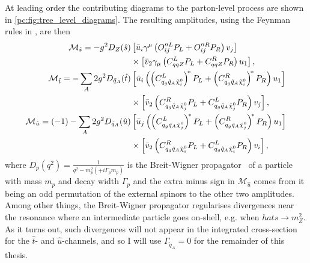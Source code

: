 \documentclass[../main.tex]{subfiles}
\begin{document}
At leading order the contributing diagrams to the parton-level process are shown in \cref{pc:fig:tree_level_diagrams}.
The resulting amplitudes, using the Feynman rules in , are then
\begin{subequations}
  \begin{align}
    \nonumber
    \M_{\hat{s}} = -g^2 D_Z(\hat{s})                         & \bclosed{ \bar{u}_i\gamma^\mu\pclosed{O^{\prime\prime L}_{ij}P_L + O^{\prime\prime R}_{ij}P_R} v_j }                                              \\
    \label{part:eq:Ms}
                                                             & \times \bclosed{ \bar{v}_2 \gamma_\mu \pclosed{C^L_{qqZ}P_L + C^R_{qqZ}P_R} u_1 },                                                                \\
    \nonumber
    \M_{\hat{t}} = -\sum_A 2g^2 D_{\tilde{q}_A}(\hat{t})     & \bclosed{ \bar{u}_i \pclosed{\pclosed{C_{q_g \tilde{q}_A \nino[i]}^L}^{\!\ast} P_L + \pclosed{C_{q_g \tilde{q}_A \nino[i]}^R}^{\!\ast} P_R} u_1 } \\
    \label{part:eq:Mt}
                                                             & \times \bclosed{ \bar{v}_2 \pclosed{C_{q_g \tilde{q}_A \nino[j]}^R P_L + C_{q_g \tilde{q}_A \nino[j]}^L P_R} v_j },                               \\
    \nonumber
    \M_{\hat{u}} = (-1)-\sum_A 2g^2 D_{\tilde{q}_A}(\hat{u}) & \bclosed{ \bar{u}_j \pclosed{\pclosed{C_{q_g \tilde{q}_A \nino[j]}^L}^{\!\ast} P_L + \pclosed{C_{q_g \tilde{q}_A \nino[j]}^R}^{\!\ast} P_R} u_1 } \\
    \label{part:eq:Mu}
                                                             & \times \bclosed{ \bar{v}_2 \pclosed{C_{q_g \tilde{q}_A \nino[i]}^R P_L + C_{q_g \tilde{q}_A \nino[i]}^L P_R} v_i },
  \end{align}
\end{subequations}
where \(D_p(q^2) = \frac{1}{q^2 - m_p^2 (+ i\Gamma_p m_p)}\) is the
Breit-Wigner propagator~\cite{Schwartz:2014sze} of a particle with mass \(m_p\) and decay
width \(\Gamma_p\) and the extra minus sign in \(\mathcal{M}_{\hat{u}}\) comes from it being an odd permutation of the external spinors to the other two amplitudes.
Among other things, the Breit-Wigner propagator regularises divergences near the resonance where an intermediate particle goes on-shell, e.g. when \(hat{s} \to m_Z^2\).
As it turns out, such divergences will not appear in the integrated cross-section for the \(\hat{t}\)- and \(\hat{u}\)-channels, and so I will use \(\Gamma_{\tilde{q}_A} = 0\) for the remainder of this thesis.
\\
\end{document}
